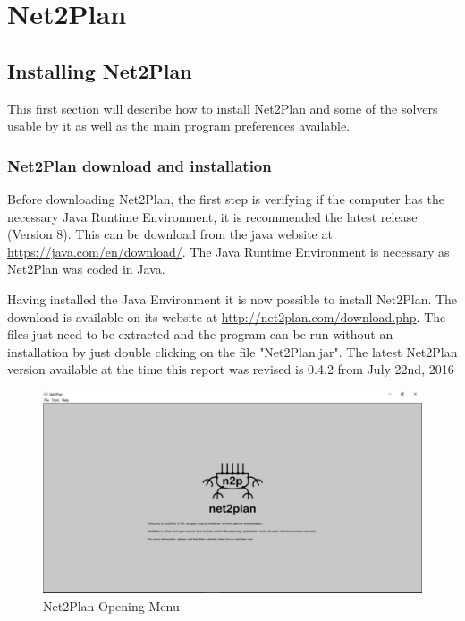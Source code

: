 \graphicspath{{./figures/}}
\section{Net2Plan}
\subsection{Installing Net2Plan}
This first section will describe how to install Net2Plan and some of the solvers usable by it as well as the main program preferences available.


    \subsubsection{Net2Plan download and installation}
    \vspace{0.5cm}
	Before downloading Net2Plan, the first step is verifying if the computer has the necessary Java Runtime Environment, it is recommended the latest release (Version 8). This can be download from the java website at \url{https://java.com/en/download/}. The Java Runtime Environment is necessary as Net2Plan was coded in Java.
		
    Having installed the Java Environment it is now possible to install Net2Plan. The download is available on its website at \url{http://net2plan.com/download.php}. The files just need to be extracted and the program can be run without an installation by just double clicking on the file "Net2Plan.jar". The latest Net2Plan version available at the time this report was revised is 0.4.2 from July 22nd, 2016

    \begin{figure}[h!]
       	\centering
       	\includegraphics[width = 13cm]{Net2Plan.pdf}
       	\caption{Net2Plan Opening Menu}
    \end{figure}

